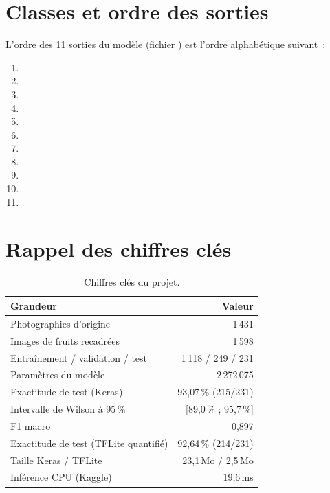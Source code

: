 \section{Classes et ordre des sorties}

L’ordre des 11 sorties du modèle (fichier ) est l’ordre alphabétique suivant~:

\begin{enumerate}[nosep,leftmargin=*]
  \item {}
  \item {}
  \item {}
  \item {}
  \item {}
  \item {}
  \item {}
  \item {}
  \item {}
  \item {}
  \item {}
\end{enumerate}

\section{Rappel des chiffres clés}

\begin{table}[H]
\centering
\caption{Chiffres clés du projet.}\label{tab:cles}
\small
\begin{tabular}{@{}lr@{}}
\toprule
\textbf{Grandeur} & \textbf{Valeur} \\
\midrule
Photographies d’origine & 1\,431 \\
Images de fruits recadrées & 1\,598 \\
Entraînement / validation / test & 1\,118 / 249 / 231 \\
Paramètres du modèle & 2\,272\,075 \\
Exactitude de test (Keras) & 93,07\,\% (215/231) \\
Intervalle de Wilson à 95\,\% & [89,0\,\% ; 95,7\,\%] \\
F1 macro & 0,897 \\
Exactitude de test (TFLite quantifié) & 92,64\,\% (214/231) \\
Taille Keras / TFLite & 23,1\,Mo / 2,5\,Mo \\
Inférence CPU (Kaggle) & 19,6\,ms \\
\bottomrule
\end{tabular}
\end{table}
